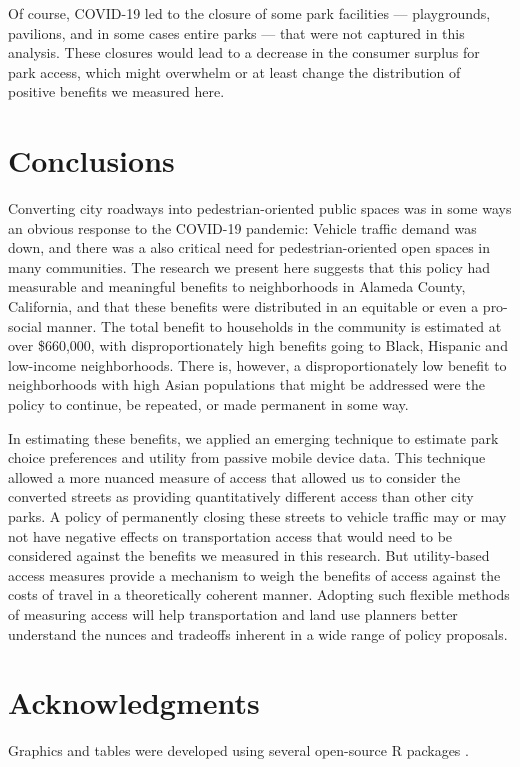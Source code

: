 \documentclass[3p, authoryear, review]{elsarticle} %
\begin{document}
Of course, COVID-19 led to the closure of some park facilities --- playgrounds, pavilions, and in some cases entire parks --- that were not captured in this analysis. These closures would lead to a decrease in the consumer surplus for park access, which might overwhelm or at least change the distribution of positive benefits we measured here.

\hypertarget{conclusions}{%
\section{Conclusions}\label{conclusions}}

Converting city roadways into pedestrian-oriented public spaces was in some ways an obvious response to the COVID-19 pandemic: Vehicle traffic demand was down, and there was a also critical need for pedestrian-oriented open spaces in many communities. The research we present here suggests that this policy had measurable and meaningful benefits to neighborhoods in Alameda County, California, and that these benefits were distributed in an equitable or even a pro-social manner. The total benefit to households in the community is estimated at over \$660,000, with disproportionately high benefits going to Black, Hispanic and low-income neighborhoods. There is, however, a disproportionately low benefit to neighborhoods with high Asian populations that might be addressed were the policy to continue, be repeated, or made permanent in some way.

In estimating these benefits, we applied an emerging technique to estimate park choice preferences and utility from passive mobile device data. This technique allowed a more nuanced measure of access that allowed us to consider the converted streets as providing quantitatively different access than other city parks. A policy of permanently closing these streets to vehicle traffic may or may not have negative effects on transportation access that would need to be considered against the benefits we measured in this research. But utility-based access measures provide a mechanism to weigh the benefits of access against the costs of travel in a theoretically coherent manner. Adopting such flexible methods of measuring access will help transportation and land use planners better understand the nunces and tradeoffs inherent in a wide range of policy proposals.

\hypertarget{acknowledgments}{%
\section*{Acknowledgments}\label{acknowledgments}}

Graphics and tables were developed using several open-source R packages
\citep{ggmap, modelsummary, wesanderson}.


\end{document}
